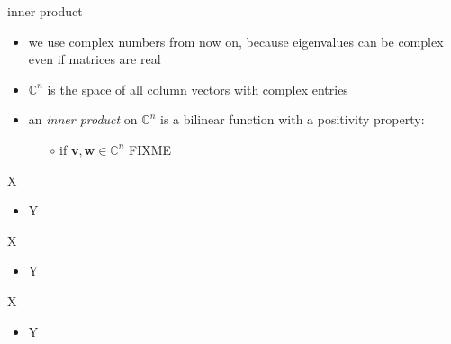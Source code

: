 \documentclass[10pt,hyperref]{beamer}
\newcommand{\bv}{\mathbf{v}}
\newcommand{\bw}{\mathbf{w}}
\newcommand{\CC}{\mathbb{C}}
\begin{document}
\begin{frame}{inner product}

\begin{itemize}
\item we use complex numbers from now on, because eigenvalues can be complex even if matrices are real
\item $\CC^n$ is the space of all column vectors with complex entries
\item an \emph{inner product} on $\CC^n$ is a bilinear function with a positivity property:
    \begin{itemize}
    \item[$\circ$] if $\bv,\bw \in \CC^n$ FIXME
    \end{itemize}
\end{itemize}
\end{frame}


\begin{frame}{X}

\begin{itemize}
\item Y
\end{itemize}
\end{frame}

\begin{frame}{X}

\begin{itemize}
\item Y
\end{itemize}
\end{frame}

\begin{frame}{X}

\begin{itemize}
\item Y
\end{itemize}
\end{frame}
\end{document}
